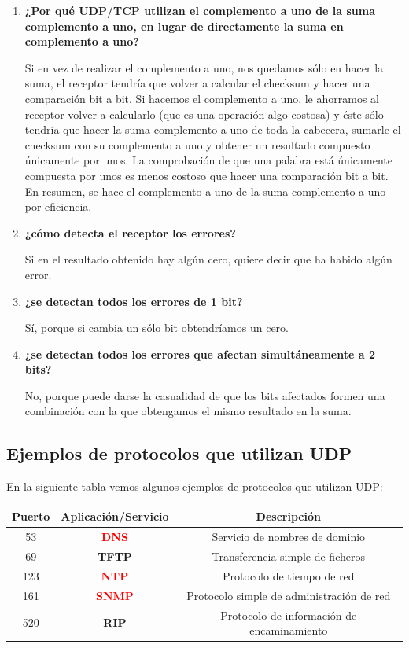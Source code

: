 \documentclass[10pt,a4paper,spanish]{report}
\begin{document}
\begin{enumerate}[\bf a)]
  \item \textbf{¿Por qué UDP/TCP utilizan el complemento a uno de la suma complemento a uno, en lugar de directamente la suma en complemento a uno?}

  Si en vez de realizar el complemento a uno, nos quedamos sólo en hacer la suma, el receptor tendría que volver a calcular el checksum y hacer una comparación bit a bit. Si hacemos el complemento a uno, le ahorramos al receptor volver a calcularlo (que es una operación algo costosa) y éste sólo tendría que hacer la suma complemento a uno de toda la cabecera, sumarle el checksum con su complemento a uno y obtener un resultado compuesto únicamente por unos. La comprobación de que una palabra está únicamente compuesta por unos es menos costoso que hacer una comparación bit a bit. En resumen, se hace el complemento a uno de la suma complemento a uno por eficiencia.

  \item \textbf{¿cómo detecta el receptor los errores?}

  Si en el resultado obtenido hay algún cero, quiere decir que ha habido algún error.

  \item \textbf{¿se detectan todos los errores de 1 bit?}

  Sí, porque si cambia un sólo bit obtendríamos un cero.  

  \item \textbf{¿se detectan todos los errores que afectan simultáneamente a 2 bits?}

  No, porque puede darse la casualidad de que los bits afectados formen una combinación con la que obtengamos el mismo resultado en la suma. %
\end{enumerate}

\subsection{\textcolor{tema3}Ejemplos de protocolos que utilizan UDP}
En la siguiente tabla vemos algunos ejemplos de protocolos que utilizan UDP:

\begin{center}
{
\begin{tabular}{| c | c | c |}
\hline
\textbf{Puerto} & \textbf{Aplicación/Servicio} & \textbf{Descripción} \\
\hline
53 & \textcolor{red}{\textbf{DNS}} & Servicio de nombres de dominio \\
\hline
69 & \textbf{TFTP} & Transferencia simple de ficheros \\
\hline
123 & \textcolor{red}{\textbf{NTP}} & Protocolo de tiempo de red \\
\hline
161 & \textcolor{red}{\textbf{SNMP}} & Protocolo simple de administración de red \\
\hline
520 & \textbf{RIP} & Protocolo de información de encaminamiento \\
\hline
\end{tabular}
}
\end{center}
\end{document}
